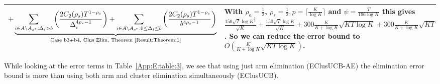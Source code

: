 \begin{table}
\begin{center}
\begin{tabular}{p{1.4cm}p{10.3cm}p{3.5cm}}
\begin{align*}
 + \underbrace{\sum_{i\in A\setminus A_{s^*}:\Delta_{i} > b}\bigg(\dfrac{2C_{2}(\rho_{s})T^{1-\rho_{s}}}{\Delta_{i}^{4\rho_{s}-1}} \bigg)+ \sum_{i\in A\setminus A_{s^*}:0\leq\Delta_{i}\leq b}\bigg(\dfrac{2C_{2}(\rho_{s})T^{1-\rho_{s}}}{b^{4\rho_{s} -1}} \bigg)}_{\text{Case b3+b4, Clus Elim, Theorem \ref{Result:Theorem:1}}} \end{align*} & With $\rho_{a}=\frac{1}{2}$, $\rho_{s}=\frac{1}{2}, p=\lceil \frac{K}{\log K}\rceil$ and $\psi=\frac{T}{196 \log K}$ this gives $\frac{150 \sqrt{T}\log K^{\frac{3}{2}} }{\sqrt{K}} + \frac{150 \sqrt{T}\log K}{\sqrt{K}} + 300 \frac{K}{K+\log K}\sqrt{KT\log K} + 300 \frac{K}{K+\log K}\sqrt{KT}$. So we can reduce the error bound to $O(\frac{K}{K+\log K}\sqrt{KT\log K})$.\\
\hline
\end{tabular}
\end{center}	
\end{table}
 
While looking at the error terms in Table~\ref{App:E:table:3}, we see that using just arm elimination (EClusUCB-AE) the elimination error bound is more than using both arm and cluster  elimination simultaneously (EClusUCB). 
 
 
 
